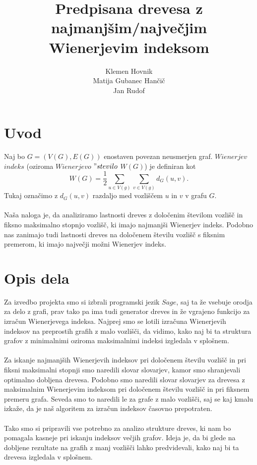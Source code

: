 \documentclass[a4paper]{article}
\title{Predpisana drevesa z najmanjšim/največjim Wienerjevim indeksom}
\author{Klemen Hovnik\\ Matija Gubanec Hančič \\ Jan Rudof}
\begin{document}
\maketitle

\section{Uvod}

Naj bo $G=(V(G),  E(G))$ enostaven povezan neusmerjen graf. $Wienerjev$ $ indeks$ (oziroma $Wienerjevo$  $"stevilo$ $ W(G)$) je definiran kot
\begin{equation}
W(G) = \frac{1}{2}\sum_{u\in V(g)}\sum_{v\in V(g)} d_G(u,v).
\end{equation}
Tukaj označimo z $d_G(u,v)$ razdaljo med vozliščem $u$ in $v$ v grafu $G$. 
\\
\\
Naša naloga je, da analiziramo lastnosti dreves z določenim številom vozlišč in 
fiksno maksimalno stopnjo vozlišč, ki imajo najmanjši Wienerjev indeks. Podobno nas zanimajo tudi lastnosti 
dreves na določenem številu vozlišč s fiksnim premerom, ki imajo največji možni Wienerjev indeks.

\section{Opis dela}

Za izvedbo projekta smo si izbrali programski jezik $Sage$, saj ta že vsebuje orodja za delo z grafi, prav tako 
pa ima tudi generator dreves in že vgrajeno funkcijo za izračun Wienerjevega indeksa. Najprej smo se lotili 
izračuna Wienerjevih indeksov na preprostih grafih z malo vozlišči, da vidimo, kako naj bi ta struktura grafov 
z minimalnimi oziroma maksimalnimi indeksi izgledala v splošnem. 
\\
\\
Za iskanje najmanjših Wienerjevih indeksov pri določenem številu vozlišč in pri fiksni maksimalni stopnji 
smo naredili slovar slovarjev, kamor smo shranjevali optimalno dobljena drevesa. Podobno smo naredili 
slovar slovarjev za drevesa z maksimalnim Wienerjevim indeksom pri določenem številu vozlišč in pri 
fiksnem premeru grafa. Seveda smo to naredili le za grafe z malo vozlišči, saj se kaj kmalu izkaže, da je 
naš algoritem za izračun indeksov časovno prepotraten.
\\
\\
Tako smo si pripravili vse potrebno za analizo strukture dreves, ki nam bo pomagala kasneje pri iskanju 
indeksov večjih grafov. Ideja je, da bi glede na dobljene rezultate na grafih z manj vozlišči lahko predvidevali,
kako naj bi ta drevesa izgledala v splošnem.
\end{document}

